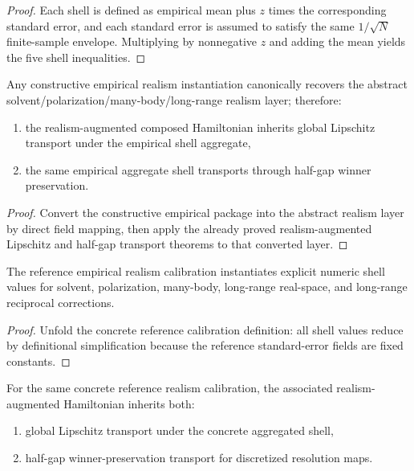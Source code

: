 \begin{proof}
Each shell is defined as empirical mean plus $z$ times the corresponding standard error, and each standard error is assumed to satisfy the same $1/\sqrt{N}$ finite-sample envelope. Multiplying by nonnegative $z$ and adding the mean yields the five shell inequalities.
\end{proof}

\begin{theorem}\label{thm:constructive-empirical-realism-transport}
Any constructive empirical realism instantiation canonically recovers the abstract solvent/polarization/many-body/long-range realism layer; therefore:
\begin{enumerate}
\item the realism-augmented composed Hamiltonian inherits global Lipschitz transport under the empirical shell aggregate,
\item the same empirical aggregate shell transports through half-gap winner preservation.
\end{enumerate}
\end{theorem}

\begin{proof}
Convert the constructive empirical package into the abstract realism layer by direct field mapping, then apply the already proved realism-augmented Lipschitz and half-gap transport theorems to that converted layer.
\end{proof}

\begin{theorem}\label{thm:biomolecular-reference-realism-shell-values}
The reference empirical realism calibration instantiates explicit numeric shell values for solvent, polarization, many-body, long-range real-space, and long-range reciprocal corrections.
\end{theorem}

\begin{proof}
Unfold the concrete reference calibration definition: all shell values reduce by definitional simplification because the reference standard-error fields are fixed constants.
\end{proof}

\begin{theorem}\label{thm:biomolecular-reference-realism-transport}
For the same concrete reference realism calibration, the associated realism-augmented Hamiltonian inherits both:
\begin{enumerate}
\item global Lipschitz transport under the concrete aggregated shell,
\item half-gap winner-preservation transport for discretized resolution maps.
\end{enumerate}
\end{theorem}

